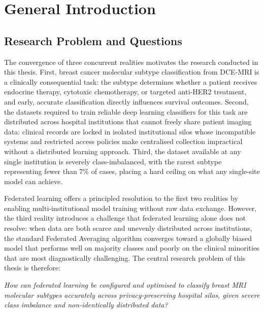 \chapter*{General Introduction}

\section*{Research Problem and Questions}

The convergence of three concurrent realities motivates
the research conducted in this thesis.
First, breast cancer molecular subtype classification from
DCE-MRI is a clinically consequential task: the subtype
determines whether a patient receives endocrine therapy,
cytotoxic chemotherapy, or targeted anti-HER2 treatment,
and early, accurate classification directly influences
survival outcomes.
Second, the datasets required to train reliable deep
learning classifiers for this task are distributed across
hospital institutions that cannot freely share patient
imaging data: clinical records are locked in isolated
institutional silos whose incompatible systems and
restricted access policies make centralised collection
impractical without a distributed learning approach.
Third, the dataset available at any single institution is
severely class-imbalanced, with the rarest subtype
representing fewer than 7\% of cases, placing a hard
ceiling on what any single-site model can achieve.

Federated learning offers a principled resolution to the
first two realities by enabling multi-institutional model
training without raw data exchange.
However, the third reality introduces a challenge that
federated learning alone does not resolve: when data are
both scarce and unevenly distributed across institutions,
the standard Federated Averaging algorithm converges
toward a globally biased model that performs well on
majority classes and poorly on the clinical minorities
that are most diagnostically challenging.
The central research problem of this thesis is therefore:

\begin{center}
\textit{How can federated learning be configured and
optimised to classify breast MRI molecular subtypes
accurately across privacy-preserving hospital silos,
given severe class imbalance and non-identically
distributed data?}
\end{center}

